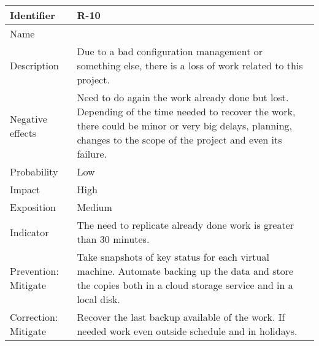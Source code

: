 \begin{table}[H]
	\begin{tabularx}{\textwidth}{|y|z|}
		\hline
		Identifier & \textbf{R-10} \\ \hline
		Name & \Rdiez \\ \hline
		Description &
			Due to a bad configuration management or something else, there is a loss of work related to this project.
		\\ \hline
		Negative effects &
			Need to do again the work already done but lost.\linej
			Depending of the time needed to recover the work, there could be minor or very big delays, planning, changes to the scope of the project and even its failure.
		\\ \hline
		Probability & Low\\ \hline
		Impact &  High\\ \hline
		Exposition &  Medium\\ \hline
		Indicator & The need to replicate already done work is greater than 30 minutes.\\ \hline
		Prevention: Mitigate &
			Take snapshots of key status for each virtual machine. \linej
			Automate backing up the data and store the copies both in a cloud storage service and in a local disk.
		\\ \hline
		Correction: Mitigate &
			Recover the last backup available of the work. \linej
			If needed work even outside schedule and in holidays.
		\\ \hline
	\end{tabularx}
\end{table}

